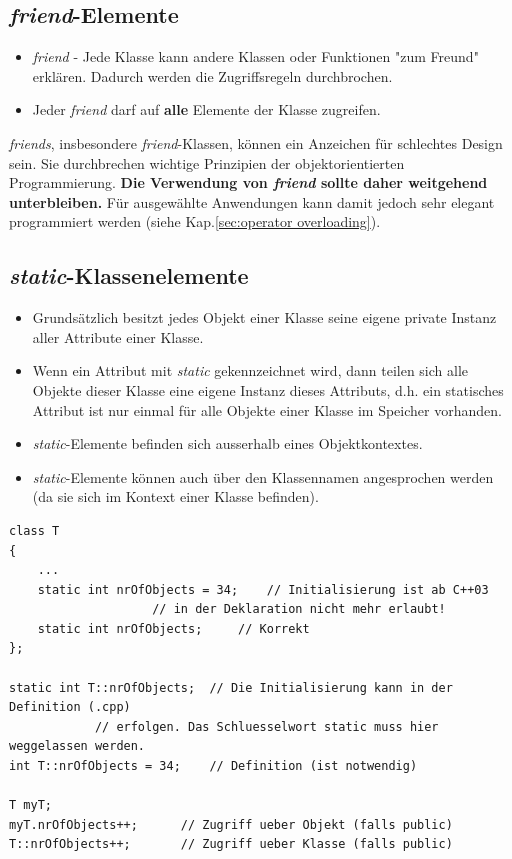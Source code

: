 \subsection{\emph{friend}-Elemente}
\begin{itemize}
	\item \emph{friend} - Jede Klasse kann andere Klassen oder Funktionen "zum Freund" erklären. Dadurch werden die Zugriffsregeln durchbrochen.
	\item Jeder \emph{friend} darf auf \textbf{alle} Elemente der Klasse zugreifen.
\end{itemize}
\begin{achtung}
	\emph{friends}, insbesondere \emph{friend}-Klassen, können ein Anzeichen für schlechtes Design sein. Sie durchbrechen wichtige Prinzipien der objektorientierten Programmierung.
	\textbf{Die Verwendung von \emph{friend} sollte daher weitgehend unterbleiben.}
	Für ausgewählte Anwendungen kann damit jedoch sehr elegant programmiert werden (siehe Kap.\ref{sec:operator overloading}).
\end{achtung}

\subsection{\emph{static}-Klassenelemente}
\begin{itemize}
	\item Grundsätzlich besitzt jedes Objekt einer Klasse seine eigene private Instanz aller Attribute einer Klasse.
	\item Wenn ein Attribut mit \emph{static} gekennzeichnet wird, dann teilen sich alle Objekte dieser Klasse eine eigene Instanz dieses Attributs, d.h. ein statisches Attribut ist nur einmal für alle Objekte einer Klasse im Speicher vorhanden.
	\item \emph{static}-Elemente befinden sich ausserhalb eines Objektkontextes.
	\item \emph{static}-Elemente können auch über den Klassennamen angesprochen werden (da sie sich im Kontext einer Klasse befinden).
\end{itemize}
\vspace{-\baselineskip}
\begin{minipage}{\linewidth}
\begin{lstlisting}
class T
{
	...
	static int nrOfObjects = 34;	// Initialisierung ist ab C++03
					// in der Deklaration nicht mehr erlaubt!
	static int nrOfObjects;		// Korrekt
};

static int T::nrOfObjects;	// Die Initialisierung kann in der Definition (.cpp)
			// erfolgen. Das Schluesselwort static muss hier weggelassen werden.
int T::nrOfObjects = 34;	// Definition (ist notwendig)

T myT;
myT.nrOfObjects++;		// Zugriff ueber Objekt (falls public)
T::nrOfObjects++;		// Zugriff ueber Klasse (falls public)
\end{lstlisting}
\end{minipage}

